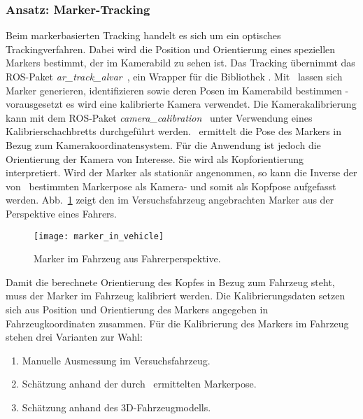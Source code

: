 \subsubsection{Ansatz: Marker-Tracking}
\label{headtracking_markertracking_subsubsec}

Beim markerbasierten Tracking handelt es sich um ein optisches Trackingverfahren.
Dabei wird die Position und Orientierung eines speziellen Markers bestimmt, der im Kamerabild zu sehen ist.
Das Tracking übernimmt das \ac{ROS}-Paket \emph{ar\_track\_alvar}~\cite{ros_ar_track_alvar}, ein Wrapper für die Bibliothek \alvar.
Mit \alvar \ lassen sich Marker generieren, identifizieren sowie deren Posen im Kamerabild bestimmen - vorausgesetzt es wird eine kalibrierte Kamera verwendet.
Die Kamerakalibrierung kann mit dem \ac{ROS}-Paket \emph{camera\_calibration}~\cite{ros_camera_calibration} unter Verwendung eines Kalibrierschachbretts durchgeführt werden.
\alvar \ ermittelt die Pose des Markers in Bezug zum Kamerakoordinatensystem.
Für die Anwendung ist jedoch die Orientierung der Kamera von Interesse.
Sie wird als Kopforientierung interpretiert.
Wird der Marker als stationär angenommen, so kann die Inverse der von \alvar \ bestimmten Markerpose als Kamera- und somit als Kopfpose aufgefasst werden.
Abb.~\ref{fig:marker_in_vehicle_driver_view} zeigt den im Versuchsfahrzeug angebrachten Marker aus der Perspektive eines Fahrers.

\begin{figure}
  \centering
  \texttt{[image: marker\_in\_vehicle]}
  \caption{Marker im Fahrzeug aus Fahrerperspektive.}
  \label{fig:marker_in_vehicle_driver_view}
\end{figure}

Damit die berechnete Orientierung des Kopfes in Bezug zum Fahrzeug steht, muss der Marker im Fahrzeug kalibriert werden.
Die Kalibrierungsdaten setzen sich aus Position und Orientierung des Markers angegeben in Fahrzeugkoordinaten zusammen.
Für die Kalibrierung des Markers im Fahrzeug stehen drei Varianten zur Wahl:
\begin{enumerate}
 \item Manuelle Ausmessung im Versuchsfahrzeug.
 \item Schätzung anhand der durch \alvar \ ermittelten Markerpose.
 \item Schätzung anhand des 3D-Fahrzeugmodells.
\end{enumerate}

